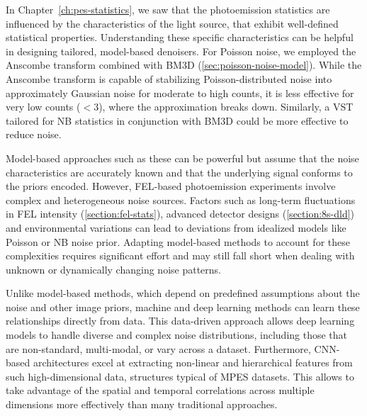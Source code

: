 In Chapter~\ref{ch:pes-statistics}, we saw that the photoemission statistics are influenced by the characteristics of the light source, that exhibit well-defined statistical properties. Understanding these specific characteristics can be helpful in designing tailored, model-based denoisers. For Poisson noise, we employed the Anscombe transform combined with \gls{BM3D} (\cref{sec:poisson-noise-model}). While the Anscombe transform is capable of stabilizing Poisson-distributed noise into approximately Gaussian noise for moderate to high counts, it is less effective for very low counts ($<3$), where the approximation breaks down. Similarly, a \gls{VST} tailored for \gls{NB} statistics in conjunction with \gls{BM3D} could be more effective to reduce noise.

Model-based approaches such as these can be powerful but assume that the noise characteristics are accurately known and that the underlying signal conforms to the priors encoded. However, \gls{FEL}-based photoemission experiments involve complex and heterogeneous noise sources. Factors such as long-term fluctuations in \gls{FEL} intensity (\cref{section:fel-stats}), advanced detector designs (\cref{section:8s-dld}) and environmental variations can lead to deviations from idealized models like Poisson or \gls{NB} noise prior. Adapting model-based methods to account for these complexities requires significant effort and may still fall short when dealing with unknown or dynamically changing noise patterns.

Unlike model-based methods, which depend on predefined assumptions about the noise and other image priors, machine and deep learning methods  can learn these relationships directly from data. This data-driven approach allows deep  learning models to handle diverse and complex noise distributions, including those that are non-standard, multi-modal, or vary across a dataset. Furthermore, \gls{CNN}-based architectures excel at extracting non-linear and hierarchical features from such  high-dimensional data, structures typical of \gls{MPES} datasets. This allows to take advantage of the spatial and temporal correlations across multiple dimensions more effectively than many traditional approaches.

